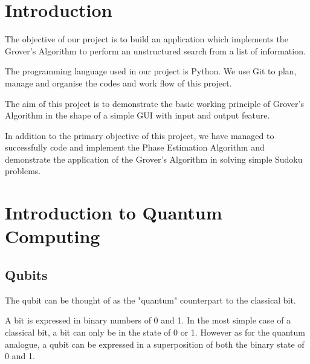 \documentclass{article}
\begin{document}
\vspace{10mm}

\section*{Introduction} %
\vspace{10mm}

The objective of our project is to build an application which implements the Grover's Algorithm to perform an unstructured search from a list of information.
\vspace{5mm}

\noindent
The programming language used in our project is Python. We use Git to plan, manage and organise the codes and work flow of this project. 
\vspace{5mm}

\noindent
The aim of this project is to demonstrate the basic working principle of Grover's Algorithm in the shape of a simple GUI with input and output feature.
\vspace{5mm}

\noindent
In addition to the primary objective of this project, we have managed to successfully code and implement the Phase Estimation Algorithm and demonstrate the application of the Grover's Algorithm in solving simple Sudoku problems.
\pagebreak


\tableofcontents %
\pagebreak

\section{Introduction to Quantum Computing}
\vspace{5mm}

\subsection{Qubits}
\vspace{5mm}

The qubit can be thought of as the "quantum" counterpart to the classical bit. 
\vspace{5mm}

\noindent
A bit is expressed in binary numbers of 0 and 1. In the most simple case of a classical bit, a bit can only be in the state of 0 or 1. However as for the quantum analogue, a qubit can be expressed in a superposition of both the binary state of 0 and 1.
\vspace{5mm}
\end{document}
